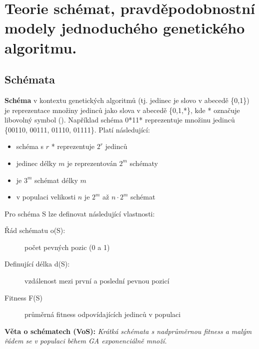 \section{Teorie schémat, pravděpodobnostní modely jednoduchého genetického algoritmu.}
\subsection{Schémata}
\textbf{Schéma} v kontextu genetických algoritmů (tj. jedinec je slovo v abecedě \{0,1\}) je reprezentace množiny jedinců jako slova v abecedě \{0,1,*\}, kde * označuje libovolný symbol (). Například schéma 0*11* reprezentuje množinu jedinců \{00110, 00111, 01110, 01111\}. Platí následující:
\begin{itemize}
	
	
	\item schéma s $r$ * reprezentuje $2^r$ jedinců
	\item jedinec délky $m$ je reprezentován $2^m$ schématy
	\item je $3^m$ schémat délky $m$
	\item v populaci velikosti $n$ je $2^m$ až $n\cdot2^m$ schémat
\end{itemize}
Pro schéma S lze definovat následující vlastnosti:
\begin{description}
	
	
	\item[Řád schématu o(S):] počet pevných pozic (0 a 1) 
	\item[Definující délka d(S):] vzdálenost mezi první a poslední pevnou pozicí
	\item[Fitness F(S)] průměrná fitness odpovídajících jedinců v populaci
\end{description}

\noindent\textbf{Věta o schématech (VoS):} \textit{Krátká schémata s nadprůměrnou fitness a malým řádem se v populaci během GA exponenciálně množí.}


